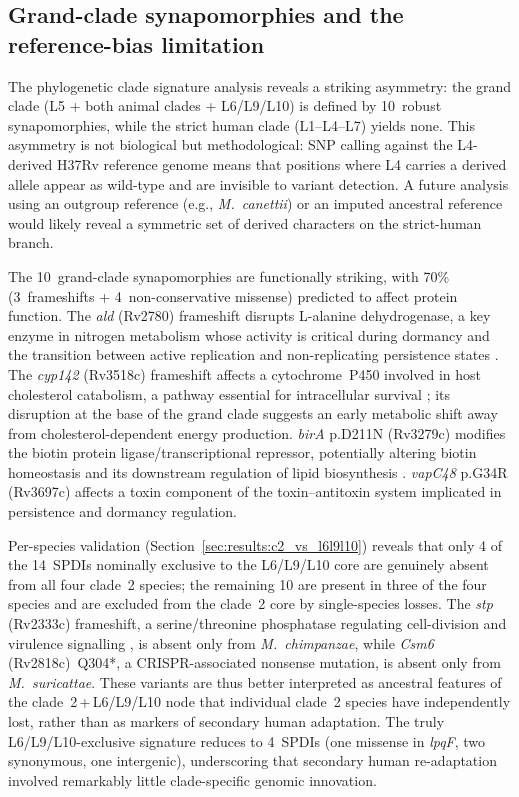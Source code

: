 \documentclass[11pt,a4paper]{article}
\newcommand{\Msur}{\textit{M.~suricattae}}
\newcommand{\Mchi}{\textit{M.~chimpanzae}}
\begin{document}
\subsection{Grand-clade synapomorphies and the reference-bias limitation}
\label{sec:disc:clade_sig}

The phylogenetic clade signature analysis reveals a striking asymmetry: the
grand clade (L5 + both animal clades + L6/L9/L10) is defined by 10~robust
synapomorphies, while the strict human clade (L1--L4--L7) yields none.
%
This asymmetry is not biological but methodological: SNP calling against
the L4-derived H37Rv reference genome means that positions where L4 carries
a derived allele appear as wild-type and are invisible to variant detection.
%
A future analysis using an outgroup reference (e.g., \textit{M.~canettii})
or an imputed ancestral reference \cite{Malaga2024} would likely reveal a
symmetric set of derived characters on the strict-human branch.

The 10~grand-clade synapomorphies are functionally striking, with 70\%
(3~frameshifts + 4~non-conservative missense) predicted to affect protein
function.
%
The \textit{ald} (Rv2780) frameshift disrupts L-alanine dehydrogenase, a
key enzyme in nitrogen metabolism whose activity is critical during
dormancy and the transition between active replication and non-replicating
persistence states \cite{Hutter2004}.
%
The \textit{cyp142} (Rv3518c) frameshift affects a cytochrome~P450 involved
in host cholesterol catabolism, a pathway essential for intracellular survival
\cite{Johnston2010}; its disruption at the base of the grand clade
suggests an early metabolic shift away from cholesterol-dependent energy
production.
%
\textit{birA} p.D211N (Rv3279c) modifies the biotin protein
ligase/transcriptional repressor, potentially altering biotin homeostasis
and its downstream regulation of lipid biosynthesis \cite{Dey2010}.
%
\textit{vapC48} p.G34R (Rv3697c) affects a toxin component of the
toxin--antitoxin system implicated in persistence and dormancy regulation.

Per-species validation (Section~\ref{sec:results:c2_vs_l6l9l10}) reveals
that only 4 of the 14~SPDIs nominally exclusive to the L6/L9/L10 core are
genuinely absent from all four clade~2 species; the remaining 10 are present
in three of the four species and are excluded from the clade~2 core by
single-species losses.
%
The \textit{stp} (Rv2333c) frameshift, a serine/threonine phosphatase
regulating cell-division and virulence signalling \cite{Bach2008}, is
absent only from \Mchi{}, while \textit{Csm6} (Rv2818c)~Q304*, a
CRISPR-associated nonsense mutation, is absent only from \Msur{}.
%
These variants are thus better interpreted as ancestral features of the
clade~2\,+\,L6/L9/L10 node that individual clade~2 species have
independently lost, rather than as markers of secondary human adaptation.
%
The truly L6/L9/L10-exclusive signature reduces to 4~SPDIs (one missense
in \textit{lpqF}, two synonymous, one intergenic), underscoring that
secondary human re-adaptation involved remarkably little clade-specific
genomic innovation.
\end{document}
